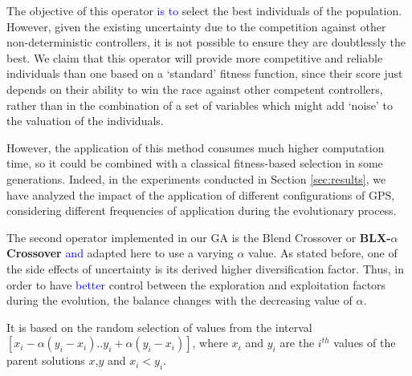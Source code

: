 \documentclass[10pt,journal,compsoc]{IEEEtran}
\begin{document}
The objective of this operator \textcolor{blue}{is to} select the best
individuals of the population. However, given the existing uncertainty
\cite{DBLP:journals/tcci/MereloLFGCCRMGTCC16} due to the competition
against other non-deterministic controllers, it is not possible to
ensure they are doubtlessly the best. We claim that this operator will
provide more competitive and reliable individuals than one based on a
`standard' fitness function, since their score just depends on their
ability to win the race against other competent controllers, rather
than in the combination of a set of variables which might add `noise'
to the valuation of the individuals.

However, the application of this method consumes much higher computation time, so it could be combined with a classical fitness-based selection in some generations. Indeed, in the experiments conducted in Section \ref{sec:results}, we have analyzed the impact of the application of different configurations of GPS, considering different frequencies of application during the evolutionary process.

The second operator implemented in our GA is the Blend Crossover or \textbf{BLX-$\alpha$ Crossover} \cite{blx2008} \textcolor{blue}{ and} adapted here to use a varying $\alpha$ value. As stated before, one of the side effects of uncertainty is its derived higher diversification factor. Thus, in order to have \textcolor{blue}{better} control between the exploration and exploitation factors during the evolution, the balance changes with the decreasing value of $\alpha$.

It is based on the random selection of values from the interval
$[x_i-\alpha(y_i-x_i).. y_i+\alpha(y_i-x_i)]$, where $x_i$ and $y_i$
are the $i^{th}$ values of the parent solutions $x$,$y$ and
$x_i < y_i$. %

\end{document}
